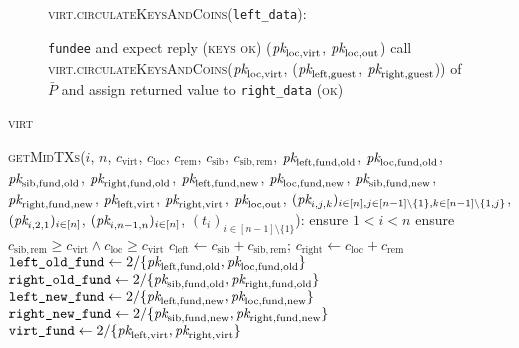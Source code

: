 \begin{figure}[H]
\begin{processbox}{\textsc{virt}.\textsc{circulateKeysAndCoins}(\texttt{left\_data}):}
\begin{algorithmic}[1]
          \texttt{fundee} and expect reply (\textsc{keys ok})
          \State \Return ($\textit{pk}_{\mathrm{loc}, \mathrm{virt}}$, $\textit{pk}_{\mathrm{loc},
          \mathrm{out}}$)
        \EndIf
      \Else \: 
        \State call \textsc{virt.circulateKeysAndCoins}($\textit{pk}_{\mathrm{loc},
        \mathrm{virt}}$, ($\textit{pk}_{\mathrm{left}, \mathrm{guest}}$,
        $\textit{pk}_{\mathrm{right}, \mathrm{guest}}$)) of $\bar{P}$ and assign
        returned value to \texttt{right\_data}
        \State \Return (\textsc{ok})
      \EndIf
    \end{algorithmic}
  \end{processbox}
  \caption{}
  \label{code:virtual-layer:circulate-keys-and-coins}
\end{figure}

\begin{processbox}{\textsc{virt}}
  \begin{algorithmic}[1]
    \State {}
    \State \textsc{getMidTXs}($i$, $n$, $c_{\mathrm{virt}}$, $c_{\mathrm{loc}}$,
    $c_{\mathrm{rem}}$, $c_{\mathrm{sib}}$, $c_{\mathrm{sib}, \mathrm{rem}}$,
    $\textit{pk}_{\mathrm{left}, \mathrm{fund}, \mathrm{old}}$, $\textit{pk}_{\mathrm{loc},
    \mathrm{fund}, \mathrm{old}}$, $\textit{pk}_{\mathrm{sib}, \mathrm{fund},
    \mathrm{old}}$, $\textit{pk}_{\mathrm{right}, \mathrm{fund}, \mathrm{old}}$,
    $\textit{pk}_{\mathrm{left}, \mathrm{fund}, \mathrm{new}}$, $\textit{pk}_{\mathrm{loc},
    \mathrm{fund}, \mathrm{new}}$, $\textit{pk}_{\mathrm{sib}, \mathrm{fund},
    \mathrm{new}}$, $\textit{pk}_{\mathrm{right}, \mathrm{fund}, \mathrm{new}}$,
    $\textit{pk}_{\mathrm{left}, \mathrm{virt}}$, $\textit{pk}_{\mathrm{right}, \mathrm{virt}}$,
    $\textit{pk}_{\mathrm{loc}, \mathrm{out}}$, $(\textit{pk}_{i,j,k})_{i \in [n], j \in [n-1]
    \setminus \{1\}, k \in [n-1] \setminus \{1, j\}}$, $(\textit{pk}_{i, 2, 1})_{i \in
    [n]}$, $(\textit{pk}_{i, n-1, n})_{i \in [n]}$, $(t_i)_{i \in [n-1] \setminus
    \{1\}}$):
    \Indent
      \State ensure $1 < i < n$
      \State ensure $c_{\mathrm{sib}, \mathrm{rem}} \geq c_{\mathrm{virt}}
      \wedge c_{\mathrm{loc}} \geq c_{\mathrm{virt}}$ 
      \State $c_{\mathrm{left}} \gets c_{\mathrm{sib}} + c_{\mathrm{sib},
      \mathrm{rem}}$; $c_{\mathrm{right}} \gets c_{\mathrm{loc}} +
      c_{\mathrm{rem}}$
      \State $\texttt{left\_old\_fund} \gets 2/\{\textit{pk}_{\mathrm{left},
      \mathrm{fund}, \mathrm{old}}, \textit{pk}_{\mathrm{loc}, \mathrm{fund},
      \mathrm{old}}\}$
      \State $\texttt{right\_old\_fund} \gets 2/\{\textit{pk}_{\mathrm{sib},
      \mathrm{fund}, \mathrm{old}}, \textit{pk}_{\mathrm{right}, \mathrm{fund},
      \mathrm{old}}\}$
      \State $\texttt{left\_new\_fund} \gets 2/\{\textit{pk}_{\mathrm{left},
      \mathrm{fund}, \mathrm{new}}, \textit{pk}_{\mathrm{loc}, \mathrm{fund},
      \mathrm{new}}\}$
      \State $\texttt{right\_new\_fund} \gets 2/\{\textit{pk}_{\mathrm{sib},
      \mathrm{fund}, \mathrm{new}}, \textit{pk}_{\mathrm{right}, \mathrm{fund},
      \mathrm{new}}\}$
      \State $\texttt{virt\_fund} \gets 2/\{\textit{pk}_{\mathrm{left}, \mathrm{virt}},
      \textit{pk}_{\mathrm{right}, \mathrm{virt}}\}$


\end{algorithmic}
\end{processbox}
